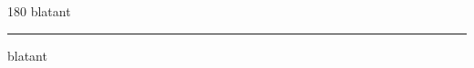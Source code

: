 
\begin{frame}
\begin{center}
\begin{turn}{180}
{\fontsize{2.5cm}{1em}\selectfont blatant}
\end{turn}
\vspace{1em}\par  
\hrule
\vspace{1em}\par  
{\fontsize{2.5cm}{1em}\selectfont blatant}
\end{center}
\end{frame}
